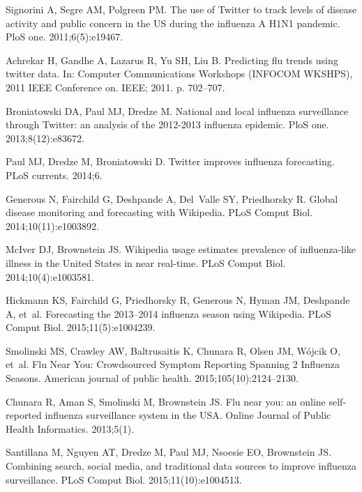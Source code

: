 \documentclass[10pt,letterpaper]{article}
\begin{document}
\begin{thebibliography}{10}
Signorini A, Segre AM, Polgreen PM.
\newblock The use of Twitter to track levels of disease activity and public
  concern in the US during the influenza A H1N1 pandemic.
\newblock PloS one. 2011;6(5):e19467.

Achrekar H, Gandhe A, Lazarus R, Yu SH, Liu B.
\newblock Predicting flu trends using twitter data.
\newblock In: Computer Communications Workshops (INFOCOM WKSHPS), 2011 IEEE
  Conference on. IEEE; 2011. p. 702--707.

Broniatowski DA, Paul MJ, Dredze M.
\newblock National and local influenza surveillance through Twitter: an
  analysis of the 2012-2013 influenza epidemic.
\newblock PloS one. 2013;8(12):e83672.

Paul MJ, Dredze M, Broniatowski D.
\newblock Twitter improves influenza forecasting.
\newblock PLoS currents. 2014;6.

Generous N, Fairchild G, Deshpande A, Del~Valle SY, Priedhorsky R.
\newblock Global disease monitoring and forecasting with Wikipedia.
\newblock PLoS Comput Biol. 2014;10(11):e1003892.

McIver DJ, Brownstein JS.
\newblock Wikipedia usage estimates prevalence of influenza-like illness in the
  United States in near real-time.
\newblock PLoS Comput Biol. 2014;10(4):e1003581.

Hickmann KS, Fairchild G, Priedhorsky R, Generous N, Hyman JM, Deshpande A,
  et~al.
\newblock Forecasting the 2013--2014 influenza season using Wikipedia.
\newblock PLoS Comput Biol. 2015;11(5):e1004239.

Smolinski MS, Crawley AW, Baltrusaitis K, Chunara R, Olsen JM, W{\'o}jcik O,
  et~al.
\newblock Flu Near You: Crowdsourced Symptom Reporting Spanning 2 Influenza
  Seasons.
\newblock American journal of public health. 2015;105(10):2124--2130.

Chunara R, Aman S, Smolinski M, Brownstein JS.
\newblock Flu near you: an online self-reported influenza surveillance system
  in the USA.
\newblock Online Journal of Public Health Informatics. 2013;5(1).

Santillana M, Nguyen AT, Dredze M, Paul MJ, Nsoesie EO, Brownstein JS.
\newblock Combining search, social media, and traditional data sources to
  improve influenza surveillance.
\newblock PLoS Comput Biol. 2015;11(10):e1004513.


\end{thebibliography}
\end{document}
